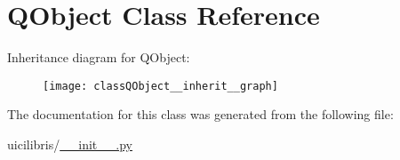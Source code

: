 \hypertarget{classQObject}{\section{\-Q\-Object \-Class \-Reference}
\label{classQObject}
}


\-Inheritance diagram for \-Q\-Object\-:
\nopagebreak
\begin{figure}[H]
\begin{center}
\leavevmode
\texttt{[image: classQObject\_\_inherit\_\_graph]}
\end{center}
\end{figure}


\-The documentation for this class was generated from the following file\-:\begin{DoxyCompactItemize}
\item 
uicilibris/\hyperlink{____init_____8py}{\-\_\-\-\_\-init\-\_\-\-\_\-.\-py}\end{DoxyCompactItemize}
